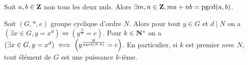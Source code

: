 	\begin{cor}
		Soit $a, b \in \mathbf{Z}$ non tous les deux nuls.
		Alors $\exists m,n \in \mathbf{Z}, ma + nb = \operatorname{pgcd}(a,b)$.
	\end{cor}

	\begin{cor}
		Soit $(G,*,e)$ groupe cyclique d'ordre $N$.
		Alors pour tout $y \in G$ et $d \mid N$ on a $(\exists x \in G, y = x^d) \iff \left( y^{\frac{N}{d}} = e \right)$.
		Pour $k \in \mathbf{N}^*$ on a $(\exists x \in G, y = x^d) \iff \left( y^{\frac{N}{\operatorname{pgcd}(N,k)}} = e \right)$.
		En particulier, si $k$ est premier avec $N$, tout élément de $G$ est une puissance $k$-ième.
	\end{cor}

	